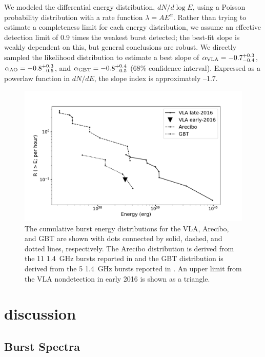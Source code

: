 \documentclass[twocolumn]{aastex61}
\begin{document}
We modeled the differential energy distribution, $dN/d\log{E}$, using a Poisson probability distribution with a rate function $\lambda = A E^{\alpha}$. Rather than trying to estimate a completeness limit for each energy distribution, we assume an effective detection limit of 0.9 times the weakest burst detected; the best-fit slope is weakly dependent on this, but general conclusions are robust. We directly sampled the likelihood distribution to estimate a best slope of $\alpha_{\rm{VLA}}=-0.7^{+0.3}_{-0.4}$, $\alpha_{\rm{AO}}=-0.8^{+0.3}_{-0.5}$, and $\alpha_{\rm{GBT}}=-0.8^{+0.4}_{-0.5}$ (68\% confidence interval). Expressed as a powerlaw function in $dN/dE$, the slope index is approximately --1.7. 

\begin{figure}[htb]
\begin{center}
\includegraphics[width=\columnwidth]{energy_disn}
\caption{The cumulative burst energy distributions for the VLA, Arecibo, and GBT are shown with dots connected by solid, dashed, and dotted lines, respectively. The Arecibo distribution is derived from the 11 1.4~GHz bursts reported in \citet{2016Natur.531..202S} and the GBT distribution is derived from the 5 1.4~GHz bursts reported in \citet{2016arXiv160308880S}. An upper limit from the VLA nondetection in early 2016 is shown as a triangle. \label{fig:ed}}
\end{center}
\end{figure}

\section{discussion}
\label{sec:disc}
\subsection{Burst Spectra}
\end{document}
